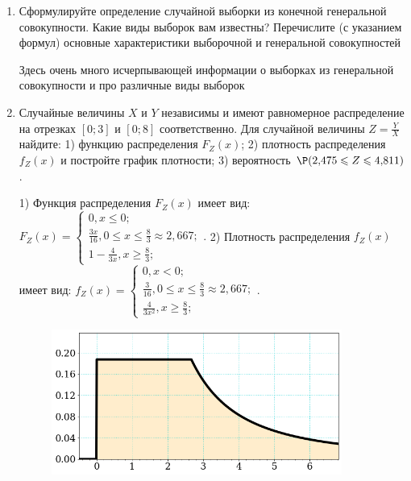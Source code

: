 \documentclass[a4paper,14pt]{article}
\begin{document}
\begin{enumerate}


\item


Сформулируйте определение случайной выборки из конечной генеральной совокупности. Какие
виды выборок вам известны? Перечислите (с указанием формул) основные характеристики выборочной и генеральной совокупностей




Здесь очень много исчерпывающей информации о выборках из генеральной совокупности и про различные виды выборок


\item



Случайные величины $X$ и $Y$ независимы и имеют равномерное
распределение на отрезках $[0;3]$ и $[0;8]$ соответственно. Для случайной величины $Z=\frac{Y}{X}$ найдите: 
1) функцию распределения $F_Z(x)$;
2) плотность распределения $f_Z(x)$ и постройте график плотности;
3) вероятность $\P(2,\!475\leqslant Z\leqslant 4,\!811)$.




1) Функция распределения $F_Z(x)$ имеет вид:
$
F_Z(x)=\left\{
\begin{array}{l}
0, x\leqslant 0;\\
\frac{3 x}{16}, 0\leqslant x\leqslant \frac{8}{3}\approx 2,\!667;\\
1 - \frac{4}{3 x}, x\geqslant\frac{8}{3};
\end{array}.
\right.
$
2) Плотность распределения $f_Z(x)$ имеет вид:
$
f_Z(x)=\left\{
\begin{array}{l}
0, x<0;\\
\frac{3}{16}, 0\leqslant x\leqslant \frac{8}{3}\approx 2,\!667;\\
\frac{4}{3 x^{2}}, x\geqslant\frac{8}{3};
\end{array}.
\right.
$


\begin{figure}[H]
    \includegraphics[width=0.9\textwidth]{2_53d8}
\end{figure}



\end{enumerate}
\end{document}
